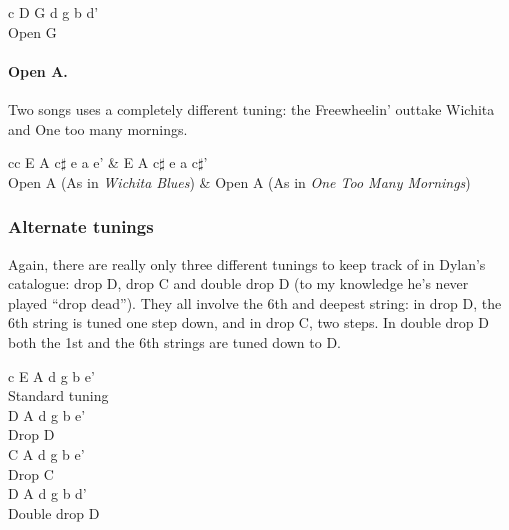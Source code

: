 \vspace{\baselineskip}
\begin{ctabular}{c}
\Large D G d g b d' \\
Open G
\end{ctabular}

\paragraph*{Open A.} Two songs uses a completely different tuning: the
Freewheelin' outtake Wichita and One too many mornings.

\vspace{\baselineskip}
\begin{ctabular}{cc}
\Large E A c$\sharp$ e a e' \hspace{2em} &
\hspace{2em} \Large E A c$\sharp$ e a c$\sharp$' \\
Open A (As in \textit{Wichita Blues}) \hspace{2em} & \hspace{2em} Open A (As in \textit{One Too Many Mornings})
\end{ctabular}

\subsubsection*{Alternate tunings}

Again, there are really only three different tunings to keep track of
in Dylan's catalogue: drop D, drop C and double drop D (to my
knowledge he's never played ``{}drop dead''{}). They all involve the
6th and deepest string: in drop D, the 6th string is tuned one step
down, and in drop C, two steps. In double drop D both the 1st and the
6th strings are tuned down to D.

\vspace{\baselineskip}
\begin{ctabular}{c}
\Large E A d g b e' \\
Standard tuning \vspace{2ex} \\
\Large D A d g b e' \\
Drop D \vspace{2ex} \\
\Large C A d g b e' \\
Drop C \vspace{2ex} \\
\Large D A d g b d'\\
Double drop D
\end{ctabular}

